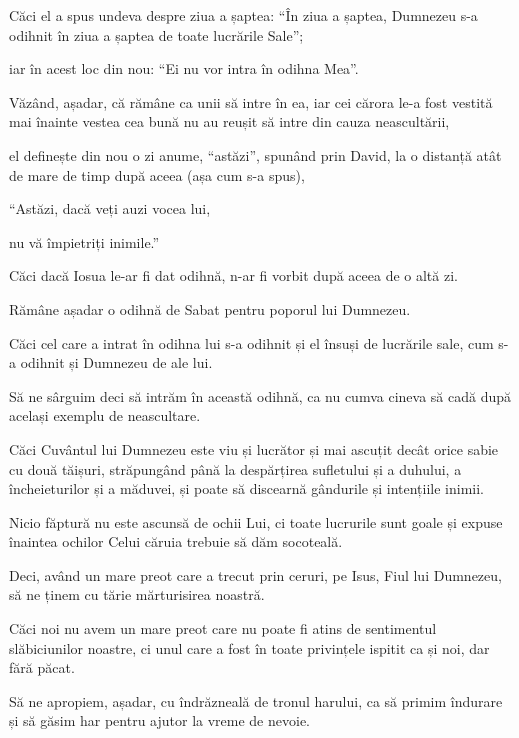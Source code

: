{Căci el a spus undeva despre ziua a șaptea: “În ziua a șaptea, Dumnezeu s-a odihnit în ziua a șaptea de toate lucrările Sale”;

iar în acest loc din nou: “Ei nu vor intra în odihna Mea”.


\par }{\PP {}Văzând, așadar, că rămâne ca unii să intre în ea, iar cei cărora le-a fost vestită mai înainte vestea cea bună nu au reușit să intre din cauza neascultării,

el definește din nou o zi anume, “astăzi”, spunând prin David, la o distanță atât de mare de timp după aceea (așa cum s-a spus),

\par }{\Q “Astăzi, dacă veți auzi vocea lui,

\par }{\QB nu vă împietriți inimile.”


\par }{\PP {}Căci dacă Iosua le-ar fi dat odihnă, n-ar fi vorbit după aceea de o altă zi.

Rămâne așadar o odihnă de Sabat pentru poporul lui Dumnezeu.

Căci cel care a intrat în odihna lui s-a odihnit și el însuși de lucrările sale, cum s-a odihnit și Dumnezeu de ale lui.

Să ne sârguim deci să intrăm în această odihnă, ca nu cumva cineva să cadă după același exemplu de neascultare.

Căci Cuvântul lui Dumnezeu este viu și lucrător și mai ascuțit decât orice sabie cu două tăișuri, străpungând până la despărțirea sufletului și a duhului, a încheieturilor și a măduvei, și poate să discearnă gândurile și intențiile inimii.

Nicio făptură nu este ascunsă de ochii Lui, ci toate lucrurile sunt goale și expuse înaintea ochilor Celui căruia trebuie să dăm socoteală.


\par }{\PP {}Deci, având un mare preot care a trecut prin ceruri, pe Isus, Fiul lui Dumnezeu, să ne ținem cu tărie mărturisirea noastră.

Căci noi nu avem un mare preot care nu poate fi atins de sentimentul slăbiciunilor noastre, ci unul care a fost în toate privințele ispitit ca și noi, dar fără păcat.

Să ne apropiem, așadar, cu îndrăzneală de tronul harului, ca să primim îndurare și să găsim har pentru ajutor la vreme de nevoie.



}

